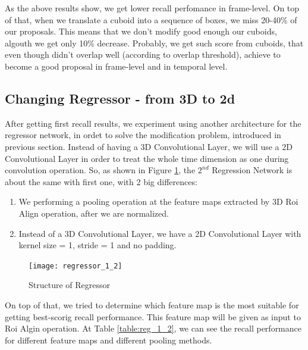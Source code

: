 As the above results show, we get lower recall perfomance in frame-level. On top of that, when we translate a cuboid into
a sequence of boxes, we miss 20-40\% of our proposals. This means that we don't modify good enough our cuboids, algouth
we get only 10\% decrease. Probably, we get such score from cuboids, that even though didn't overlap well (according to
overlap threshold), achieve to become a good proposal in frame-level and in temporal level. 


\subsection{Changing Regressor - from 3D to 2d}
After getting first recall results, we experiment using another architecture for the regressor network, in ordet to solve the modification
problem, introduced in previous section. Instead of having a 3D Convolutional Layer, we will use a 2D Convolutional Layer
in order to treat the whole time dimension as one during convolution operation. So, as shown in Figure \ref{fig:reg_1_2},
the $2^{nd}$ Regression Network is about the same with first one, with 2 big differences:
\begin{enumerate}
\item We performing a pooling operation at the feature maps extracted by 3D Roi Align operation, after we are normalized.
\item Instead of a 3D Convolutional Layer, we have a 2D Convolutional Layer with kernel size = 1, stride = 1 and no padding.
\end{enumerate}

\begin{figure}[h]

  \centering
  \texttt{[image: regressor\_1\_2]}
  \caption{Structure of Regressor}
  \label{fig:reg_1_2}
\end{figure}

On top of that, we tried to determine which feature map is the most suitable  for getting best-scorig recall performance. This feature map will be given as
input to Roi Algin operation.  At Table \ref{table:reg_1_2}, we can see the recall performance for different feature maps and different pooling methods.

